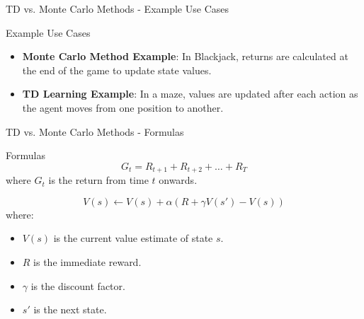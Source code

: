 \documentclass[aspectratio=169]{beamer}
\begin{document}
\begin{frame}[fragile]{TD vs. Monte Carlo Methods - Example Use Cases}
    \begin{block}{Example Use Cases}
        \begin{itemize}
            \item \textbf{Monte Carlo Method Example}: 
            In Blackjack, returns are calculated at the end of the game to update state values.
            \item \textbf{TD Learning Example}: 
            In a maze, values are updated after each action as the agent moves from one position to another.
        \end{itemize}
    \end{block}
\end{frame}

\begin{frame}[fragile]{TD vs. Monte Carlo Methods - Formulas}
    \begin{block}{Formulas}
        \begin{equation}
            G_t = R_{t+1} + R_{t+2} + \ldots + R_T
        \end{equation}
        where $G_t$ is the return from time $t$ onwards.
        
        \begin{equation}
            V(s) \leftarrow V(s) + \alpha (R + \gamma V(s') - V(s))
        \end{equation}
        where:
        \begin{itemize}
            \item $V(s)$ is the current value estimate of state $s$.
            \item $R$ is the immediate reward.
            \item $\gamma$ is the discount factor.
            \item $s'$ is the next state.
        \end{itemize}
    \end{block}
\end{frame}
\end{document}
